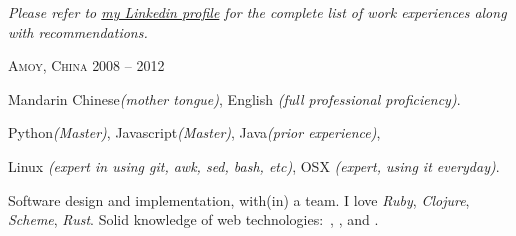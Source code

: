 \documentclass[10pt,a4paper]{article} %
\begin{document}
\begin{center}
  \textit{Please refer to \href{http://www.linkedin.com/in/linju}{my Linkedin profile} for the complete list of work experiences along with recommendations.}
\end{center}


\spacedhrule{-0.2em}{-0.4em} %



 {
  \textsc{Amoy, China}
} {
   {
    2008 -- 2012
  } {
  }
}

\spacedhrule{0.5em}{-0.4em} %



 {
  Mandarin Chinese\textit{(mother tongue)},
  English \textit{(full professional proficiency)}.
}

 {
  Python\textit{(Master)},
  Javascript\textit{(Master)},
  Java\textit{(prior experience)},
}

 {
  Linux \textit{(expert in using git, awk, sed, bash, etc)},
  OSX \textit{(expert, using it everyday)}.
}

 {
  Software design and implementation, with(in) a team.
  I love \textit{Ruby}, \textit{Clojure}, \textit{Scheme}, \textit{Rust}.
  Solid knowledge of web technologies:\ , ,  and .
}





\end{document}
